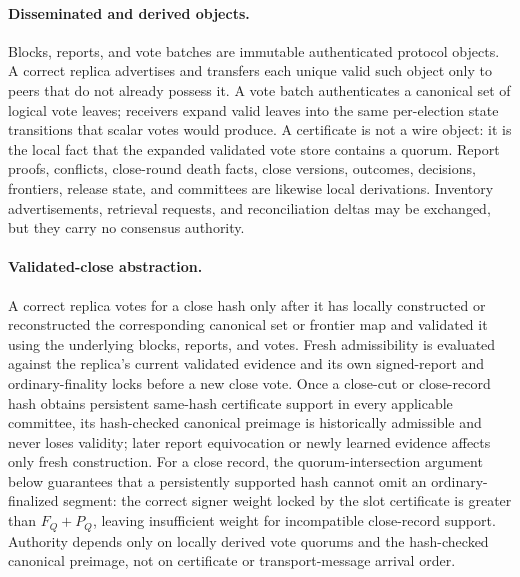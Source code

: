 \documentclass[sigplan,twocolumn,review,anonymous]{acmart}
\begin{document}
\paragraph{Disseminated and derived objects.}
Blocks, reports, and vote batches are immutable authenticated protocol objects.  A correct replica
advertises and transfers each unique valid such object only to peers that do not already possess it.  A
vote batch authenticates a canonical set of logical vote leaves; receivers expand valid leaves into the
same per-election state transitions that scalar votes would produce.  A certificate is not a wire
object: it is the local fact that the expanded validated vote store contains a quorum.  Report
proofs, conflicts, close-round death facts, close versions, outcomes, decisions, frontiers, release
state, and committees are likewise local derivations.  Inventory advertisements, retrieval requests,
and reconciliation deltas may be exchanged, but they carry no consensus authority.

\paragraph{Validated-close abstraction.}
A correct replica votes for a close hash only after it has locally constructed or reconstructed the
corresponding canonical set or frontier map and validated it using the underlying blocks, reports, and
votes.  Fresh admissibility is evaluated against the replica's current validated evidence and its own
signed-report and ordinary-finality locks before a new close vote.  Once a close-cut or close-record hash
obtains persistent same-hash certificate support in every applicable committee, its hash-checked
canonical preimage is historically admissible and never loses validity; later report equivocation or
newly learned evidence affects only fresh construction.  For a close record, the quorum-intersection
argument below guarantees that a persistently supported hash cannot omit an ordinary-finalized
segment: the correct signer weight locked by the slot certificate is greater than \(F_Q+P_Q\), leaving
insufficient weight for incompatible close-record support.  Authority depends only on locally derived
vote quorums and the hash-checked canonical preimage, not on certificate or transport-message arrival
order.
\end{document}
